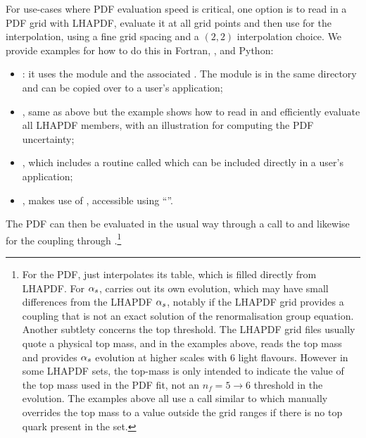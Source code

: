 For use-cases where PDF evaluation speed is critical, one option is
to read in a PDF grid with LHAPDF, evaluate it at all \hoppet grid points and
then use \hoppet for the interpolation, using a fine grid spacing and
a $(2,2)$ interpolation choice.
%
We provide examples for how to do this in Fortran, \CPP, and Python:
\begin{itemize}
 \item {}: it
   uses the module  and the associated
   . The module is in the same
   directory and can be copied over to a user's application;
 \item
   ,
   same as above but the example shows how to read in and efficiently
   evaluate all
   LHAPDF members, with an illustration for computing the PDF uncertainty;
 \item {}, which
   includes a routine called  which can be included directly in a
   user's application;
 \item {}, makes use
   of , accessible using ``''.
\end{itemize}
%
%
%
The PDF can then be evaluated in the usual
way through a call to  and likewise for the coupling
through .\footnote{%
  For the PDF, \hoppet just
  interpolates its table, which is filled directly from LHAPDF.
  For $\alpha_s$, \hoppet carries out its own evolution, which may have
  small differences from the LHAPDF $\alpha_s$, notably if the LHAPDF grid
  provides a coupling that is not an exact solution of the renormalisation
  group equation.
  Another subtlety concerns the top threshold.
  The LHAPDF grid files usually quote a physical top mass, and in the
  examples above, \hoppet reads the top mass and provides $\alpha_s$
  evolution at higher scales with $6$ light flavours.
  However in some LHAPDF sets, the top-mass is only intended to
  indicate the value of the top mass used in the PDF fit, not an $n_f = 5
  \to 6$ threshold in the evolution.
  The examples above all use a call similar to
   which manually overrides
  the top mass to a value outside the grid ranges if there is no top
  quark present in the set.
}
